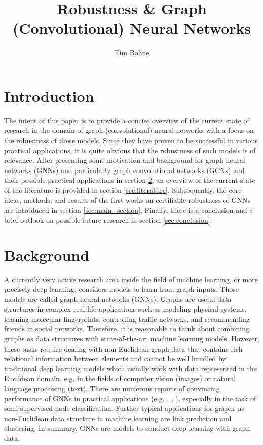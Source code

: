 \documentclass[a4paper,preprint]{sig-alternate}
\begin{document}
\title{Robustness \& Graph (Convolutional) Neural Networks}

%
\author{
%
\alignauthor Tim Bohne\\
}

\maketitle

\section{Introduction}

The intent of this paper is to provide a concise overview of the current state of research in the domain of graph (convolutional) neural networks
with a focus on the robustness of these models. Since they have proven to be successful in various practical applications, 
it is quite obvious that the robustness of such models is of relevance.
After presenting some motivation and background for graph neural networks (GNNs) and particularly graph convolutional networks (GCNs)
and their possible practical applications in section \ref{sec:background}, an overview of the current state of the literature is
provided in section \ref{sec:literature}. Subsequently, the core ideas, methods, and results of the first works on certifiable
robustness of GNNs are introduced in section \ref{sec:main_section}.
Finally, there is a conclusion and a brief outlook on possible future research in section \ref{sec:conclusion}.

\section{Background}
\label{sec:background}

A currently very active research area inside the field of machine learning, or more precisely deep learning, considers models to learn
from graph inputs. Those models are called graph neural networks (GNNs). Graphs are useful data structures in complex real-life
applications such as modeling physical systems, learning molecular fingerprints, controlling traffic networks, and recommending 
friends in social networks.\cite{article}
Therefore, it is reasonable to think about combining graphs as data structures with state-of-the-art machine learning models.
However, these tasks require dealing with non-Euclidean graph data that contains rich relational information between elements and
cannot be well handled by traditional deep learning models which usually work with data represented in the Euclidean domain, e.g. in the
fields of computer vision (images) or natural language processing (text).\cite{article}
There are numerous reports of convincing performance of GNNs in practical applications (e.g. \cite{NIPS2015_f9be311e},
\cite{hamilton2018inductive}, \cite{trivedi2017knowevolve}), especially in the task of semi-supervised node classification.\cite{xu2019topology}
Further typical applications for graphs as non-Euclidean data structure in machine learning are link prediction and clustering.\cite{zhou2019graph}
In summary, GNNs are models to conduct deep learning with graph data.
\end{document}
